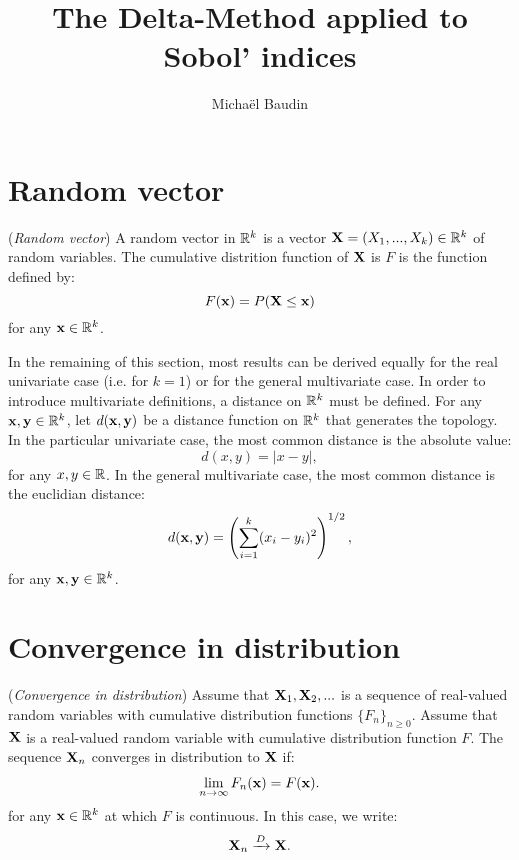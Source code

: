 \documentclass{article}
\begin{document}
\title{The Delta-Method applied to Sobol' indices}

\author{Michaël Baudin}

\maketitle



\tableofcontents


\section{Random vector}

\begin{definition}
\label{def-randomvector}
(\emph{Random vector})
A random vector in $\mathbb{R}^k$ is a vector ${\bf X} = (X_1,...,X_k) \in\mathbb{R}^k$  
of random variables. 
The cumulative distrition function of ${\bf X}$ is $F$ is the function defined by:
$$
F({\bf x}) = P({\bf X}\leq {\bf x}) 
$$
for any ${\bf x}\in\mathbb{R}^k$.
\end{definition}

In the remaining of this section, most results can be derived equally for the 
real univariate case (i.e. for $k=1$) or for the general multivariate case. 
In order to introduce multivariate definitions, a distance on $\mathbb{R}^k$ must be 
defined. 
For any ${\bf x},{\bf y}\in\mathbb{R}^k$, let $d({\bf x},{\bf y})$ be a distance function on $\mathbb{R}^k$ that 
generates the topology. 
In the particular univariate case, the most common distance is the absolute value:
$$
d(x,y)=|x-y|,
$$
for any $x,y\in\mathbb{R}$. 
In the general multivariate case, the most common distance is the euclidian distance:
$$
d({\bf x},{\bf y})=\left(\sum_{i=1}^k (x_i-y_i)^2\right)^{1/2},
$$
for any ${\bf x},{\bf y}\in\mathbb{R}^k$. 




\section{Convergence in distribution}

\begin{definition}
\label{def-convdistr}
(\emph{Convergence in distribution})
Assume that ${\bf X}_1,{\bf X}_2,...$ is a sequence of real-valued random variables 
with cumulative distribution functions $\{F_n\}_{n\geq 0}$. 
Assume that ${\bf X}$ is a real-valued random variable 
with cumulative distribution function $F$. 
The sequence ${\bf X}_n$ converges in distribution to ${\bf X}$ if:
\begin{align}
\label{def-convdistr1}
\lim_{n\rightarrow \infty} F_n({\bf x})=F({\bf x}).
\end{align}
for any ${\bf x}\in \mathbb{R}^k$ at which $F$ is continuous.
In this case, we write:
\begin{align}
\label{def-convdistr2}
{\bf X}_n \xrightarrow{D} {\bf X}.
\end{align}
\end{definition}
\end{document}
